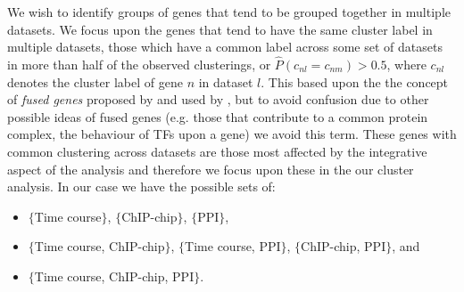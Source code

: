 \documentclass[]{article}
\begin{document}
%




We wish to identify groups of genes that tend to be grouped together in multiple datasets. We focus upon the genes that tend to have the same cluster label in multiple datasets, those which have a common label across some set of datasets in more than half of the observed clusterings, or $\hat{P}(c_{nl} = c_{nm}) > 0.5$, where $c_{nl}$ denotes the cluster label of gene $n$ in dataset $l$. This based upon the the concept of \emph{fused genes} proposed by \cite{savage2010discovering} and used by \cite{kirk2012bayesian}, but to avoid confusion due to other possible ideas of fused genes (e.g. those that contribute to a common protein complex, the behaviour of TFs upon a gene) we avoid this term. 
These genes with common clustering across datasets are those most affected by the integrative aspect of the analysis and therefore we focus upon these in the our cluster analysis. In our case we have the possible sets of:
\begin{itemize}
	\item $\{$Time course$\}$, $\{$ChIP-chip$\}$, $\{$PPI$\}$,
	\item $\{$Time course, ChIP-chip$\}$, $\{$Time course, PPI$\}$, $\{$ChIP-chip, PPI$\}$, and
	\item $\{$Time course, ChIP-chip, PPI$\}$.
\end{itemize}
\end{document}
